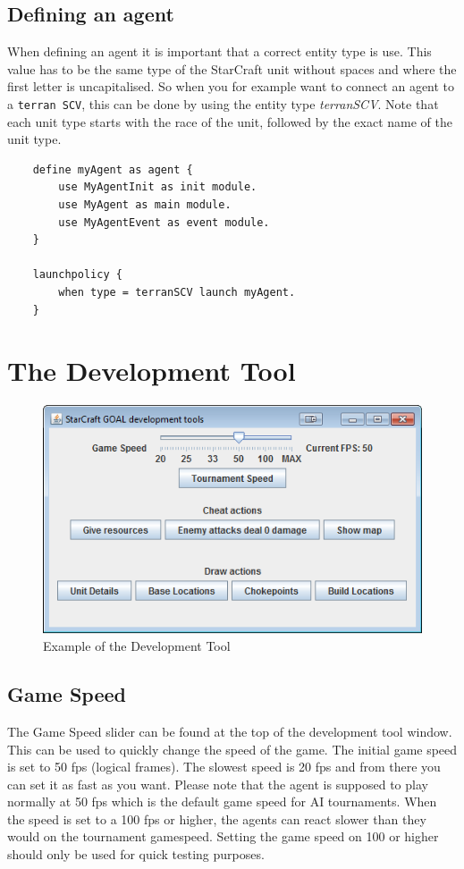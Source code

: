 \subsection{Defining an agent}
When defining an agent it is important that a correct entity type is use. This value has to be the same type of the StarCraft unit without spaces and where the first letter is uncapitalised. So when you for example want to connect an agent to a \texttt{terran SCV}, this can be done by using the entity type \textit{terranSCV}. Note that each unit type starts with the race of the unit, followed by the exact name of the unit type.

\begin{verbatim}
    define myAgent as agent {
        use MyAgentInit as init module.
        use MyAgent as main module.
        use MyAgentEvent as event module.
    }

    launchpolicy {
        when type = terranSCV launch myAgent.
    }
\end{verbatim}


\newpage
\section{The Development Tool}
\label{development tool}

\begin{figure}[h]
\includegraphics[width=1.0\textwidth]{images/developmentTool}
\caption{Example of the Development Tool}
\label{fig:StarCraft_picture}
\end{figure}

\subsection{Game Speed}
The Game Speed slider can be found at the top of the development tool window. This can be used to quickly change the speed of the game. The initial game speed is set to 50 fps (logical frames). The slowest speed is 20 fps and from there you can set it as fast as you want. Please note that the agent is supposed to play normally at 50 fps which is the default game speed for AI tournaments. When the speed is set to a 100 fps or higher, the agents can react slower than they would on the tournament gamespeed. Setting the game speed on 100 or higher should only be used for quick testing purposes.


